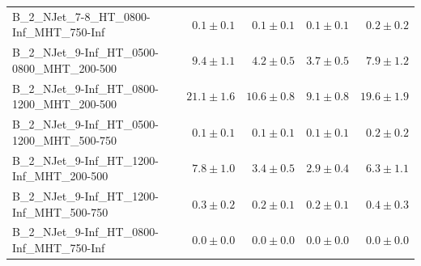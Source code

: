 \documentclass{beamer}
\begin{document}
\begin{frame}
\begin{tabular}{lrrrr}
      B\_2\_NJet\_7-8\_HT\_0800-Inf\_MHT\_750-Inf &               $0.1\pm0.1$&              $0.1\pm0.1$&              $0.1\pm0.1$&                   $0.2\pm0.2$ \\ 
   B\_2\_NJet\_9-Inf\_HT\_0500-0800\_MHT\_200-500 &               $9.4\pm1.1$&              $4.2\pm0.5$&              $3.7\pm0.5$&                   $7.9\pm1.2$ \\ 
   B\_2\_NJet\_9-Inf\_HT\_0800-1200\_MHT\_200-500 &              $21.1\pm1.6$&             $10.6\pm0.8$&              $9.1\pm0.8$&                  $19.6\pm1.9$ \\ 
   B\_2\_NJet\_9-Inf\_HT\_0500-1200\_MHT\_500-750 &               $0.1\pm0.1$&              $0.1\pm0.1$&              $0.1\pm0.1$&                   $0.2\pm0.2$ \\ 
    B\_2\_NJet\_9-Inf\_HT\_1200-Inf\_MHT\_200-500 &               $7.8\pm1.0$&              $3.4\pm0.5$&              $2.9\pm0.4$&                   $6.3\pm1.1$ \\ 
    B\_2\_NJet\_9-Inf\_HT\_1200-Inf\_MHT\_500-750 &               $0.3\pm0.2$&              $0.2\pm0.1$&              $0.2\pm0.1$&                   $0.4\pm0.3$ \\ 
    B\_2\_NJet\_9-Inf\_HT\_0800-Inf\_MHT\_750-Inf &               $0.0\pm0.0$&              $0.0\pm0.0$&              $0.0\pm0.0$&                   $0.0\pm0.0$ \\ 
\end{tabular}
\end{frame}
\end{document}
